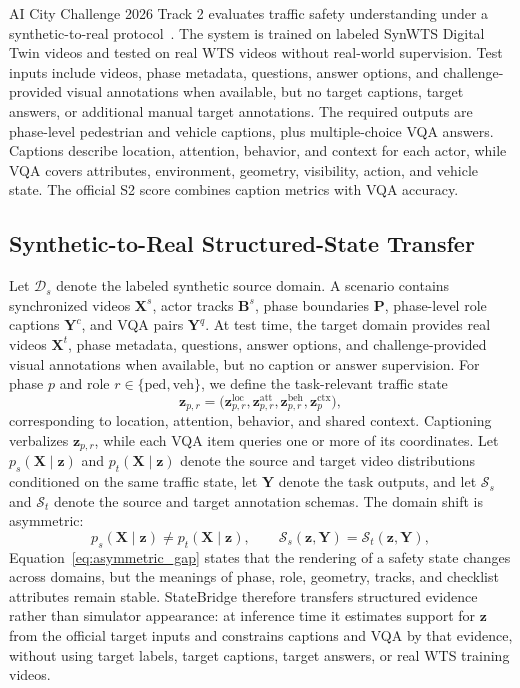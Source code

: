 \documentclass[runningheads]{llncs}
\begin{document}
AI City Challenge 2026 Track 2 evaluates traffic safety understanding under a synthetic-to-real protocol~\cite{aicitytrack2}. The system is trained on labeled SynWTS Digital Twin videos and tested on real WTS videos without real-world supervision. Test inputs include videos, phase metadata, questions, answer options, and challenge-provided visual annotations when available, but no target captions, target answers, or additional manual target annotations. The required outputs are phase-level pedestrian and vehicle captions, plus multiple-choice VQA answers. Captions describe location, attention, behavior, and context for each actor, while VQA covers attributes, environment, geometry, visibility, action, and vehicle state. The official S2 score combines caption metrics with VQA accuracy.

\subsection{Synthetic-to-Real Structured-State Transfer}

Let $\mathcal{D}_{s}$ denote the labeled synthetic source domain. A scenario contains synchronized videos $\mathbf{X}^{s}$, actor tracks $\mathbf{B}^{s}$, phase boundaries $\mathbf{P}$, phase-level role captions $\mathbf{Y}^{c}$, and VQA pairs $\mathbf{Y}^{q}$. At test time, the target domain provides real videos $\mathbf{X}^{t}$, phase metadata, questions, answer options, and challenge-provided visual annotations when available, but no caption or answer supervision. For phase $p$ and role $r\in\{\mathrm{ped},\mathrm{veh}\}$, we define the task-relevant traffic state
\begin{equation}
    \mathbf{z}_{p,r}
    =
    \bigl(\mathbf{z}^{\mathrm{loc}}_{p,r},
    \mathbf{z}^{\mathrm{att}}_{p,r},
    \mathbf{z}^{\mathrm{beh}}_{p,r},
    \mathbf{z}^{\mathrm{ctx}}_{p}
    \bigr),
    \label{eq:traffic_state}
\end{equation}
corresponding to location, attention, behavior, and shared context. Captioning verbalizes $\mathbf{z}_{p,r}$, while each VQA item queries one or more of its coordinates. Let $p_s(\mathbf{X}\mid\mathbf{z})$ and $p_t(\mathbf{X}\mid\mathbf{z})$ denote the source and target video distributions conditioned on the same traffic state, let $\mathbf{Y}$ denote the task outputs, and let $\mathcal{S}_s$ and $\mathcal{S}_t$ denote the source and target annotation schemas. The domain shift is asymmetric:
\begin{equation}
    p_s(\mathbf{X}\mid\mathbf{z})
    \neq
    p_t(\mathbf{X}\mid\mathbf{z}),
    \qquad
    \mathcal{S}_s(\mathbf{z},\mathbf{Y})
    =
    \mathcal{S}_t(\mathbf{z},\mathbf{Y}),
    \label{eq:asymmetric_gap}
\end{equation}
Equation~\ref{eq:asymmetric_gap} states that the rendering of a safety state changes across domains, but the meanings of phase, role, geometry, tracks, and checklist attributes remain stable. StateBridge therefore transfers structured evidence rather than simulator appearance: at inference time it estimates support for $\mathbf{z}$ from the official target inputs and constrains captions and VQA by that evidence, without using target labels, target captions, target answers, or real WTS training videos.
\end{document}
